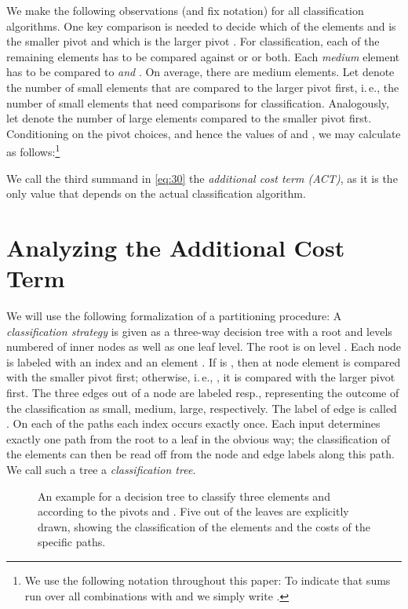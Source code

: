 \documentclass[prodmode,acmtalg]{acmsmall}
\begin{document}
We make the following observations (and fix notation) for all classification
algorithms.  One key comparison is needed to decide which of the elements 
and  is the smaller pivot  and which is the larger pivot .  For
classification, each of the remaining  elements has to be compared against
 or  or both. Each \emph{medium} element has to be compared to 
\emph{and} . On average, there are  medium elements. Let 
denote the number of small elements that are compared to the larger pivot first,
i.\,e., the number of small elements that need  comparisons for classification.
Analogously, let  denote the number of large elements compared to the
smaller pivot first. Conditioning on the pivot choices, and hence the values of
 and , we may calculate  as follows:\footnote{We use
the following notation throughout this paper: To indicate that sums run over all 
 combinations  with  and 
we simply write .}

We call the third summand in \eqref{eq:30} the \emph{additional cost term (ACT)}, as it is the only
value that depends on the actual classification algorithm.

\section{Analyzing the Additional Cost Term}\label{sec:additional:cost:term}

We will use the following formalization of a partitioning
procedure: A \emph{classification
strategy} is given as a three-way
decision tree  with a root and  levels numbered 
of inner nodes as well as one
leaf level. The root is on level . Each node  is labeled with an index
 and an element . If
 is , then at node  element  is compared with the
smaller pivot first; otherwise, i.\,e., , it is compared with the
larger pivot first. 
 The three edges out of a node are labeled  resp.,
representing the outcome of the classification as small, medium, large,
respectively. The label of edge  is called . 
On each of the  paths each index occurs exactly
once.  Each input
determines exactly one path  from the root to a leaf in the
obvious way; the
classification of the elements can then be read off from the node and edge
labels along this path. We call such a tree a \emph{classification tree}.
 \newcommand{\lv}[1]{\ensuremath{\textnormal{\textrm{level}}(#1)}}


\begin{figure}[bt]
    \centering
    \caption{An example for a decision tree to classify three elements  
    and  according to the pivots  and . 
    Five out of the  leaves are explicitly drawn, showing the classification of the elements and 
    the costs  of the specific paths.}
    \label{fig:decision:tree:ex1}
\end{figure}
\end{document}
